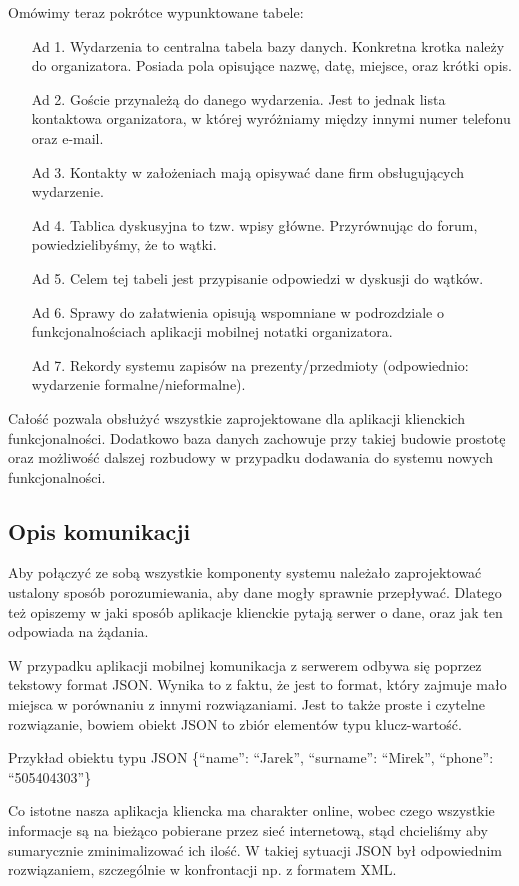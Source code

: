 \documentclass[12pt,titlepage]{article}
\begin{document}
Omówimy teraz pokrótce wypunktowane tabele:

\begin{itemize}
 \item[Ad 1.] Wydarzenia to centralna tabela bazy danych. Konkretna krotka należy do organizatora. Posiada pola opisujące nazwę, datę, miejsce, oraz krótki opis.
 \item[Ad 2.] Goście przynależą do danego wydarzenia. Jest to jednak lista kontaktowa organizatora, w której wyróżniamy między innymi numer telefonu oraz e-mail.
 \item[Ad 3.] Kontakty w założeniach mają opisywać dane firm obsługujących wydarzenie.
 \item[Ad 4.] Tablica dyskusyjna to tzw. wpisy główne. Przyrównując do forum, powiedzielibyśmy, że to wątki.
 \item[Ad 5.] Celem tej tabeli jest przypisanie odpowiedzi w dyskusji do wątków.
 \item[Ad 6.] Sprawy do załatwienia opisują wspomniane w podrozdziale o funkcjonalnościach aplikacji mobilnej notatki organizatora.
 \item[Ad 7.] Rekordy systemu zapisów na prezenty/przedmioty (odpowiednio: wydarzenie formalne/nieformalne).
\end{itemize}

Całość pozwala obsłużyć wszystkie zaprojektowane dla aplikacji klienckich funkcjonalności. Dodatkowo baza danych zachowuje przy takiej budowie prostotę oraz możliwość dalszej rozbudowy
w przypadku dodawania do systemu nowych funkcjonalności.

\subsection{Opis komunikacji} %
Aby połączyć ze sobą wszystkie komponenty systemu należało zaprojektować ustalony sposób porozumiewania, aby dane mogły sprawnie przepływać. Dlatego też opiszemy w jaki sposób aplikacje
klienckie pytają serwer o dane, oraz jak ten odpowiada na żądania.

W przypadku aplikacji mobilnej komunikacja z serwerem odbywa się poprzez tekstowy format JSON. Wynika to z faktu, że jest to format, który zajmuje mało miejsca w porównaniu z innymi rozwiązaniami.
Jest to także proste i czytelne rozwiązanie, bowiem obiekt JSON to zbiór elementów typu klucz-wartość.
\begin{beamerlikethm}{Przykład obiektu typu JSON}
\{``name'': ``Jarek'', ``surname'': ``Mirek'', ``phone'': ``505404303''\}
\end{beamerlikethm}
Co istotne nasza aplikacja kliencka ma charakter online, wobec czego wszystkie informacje są na bieżąco pobierane przez sieć internetową, stąd chcieliśmy aby sumarycznie zminimalizować ich ilość.
W takiej sytuacji JSON był odpowiednim rozwiązaniem, szczególnie w konfrontacji np. z formatem XML.
\end{document}

